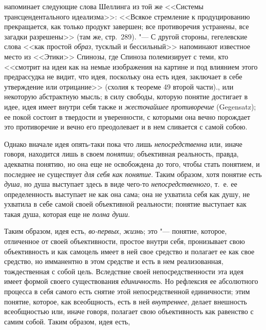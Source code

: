 {{{напоминает следующие слова Шеллинга из той же <<Системы трансцендентального
идеализма>>: <<Всякое стремление к продуцированию прекращается, как только
продукт завершен; все противоречия устранены, все загадки разрешены>> (там
же, стр.~289). "--- С другой стороны, гегелевские слова <<как простой {\em образ},
тусклый и бессильный>> напоминают известное место из <<Этики>>
Спинозы, где Спиноза полемизирует с теми, кто <<смотрит на идеи как на немые
изображения на картине и под влиянием этого предрассудка не видит, что
идея, поскольку она есть идея, заключает в себе утверждение или отрицание>>
(схолия к теореме 49 второй части).\label{bkm:bm91}},
или некоторую абстрактную мысль; в силу свободы, которую
понятие достигает в идее, идея имеет внутри себя также и
{\em жесточайшее противоречие}
(Gegensatz); ее покой состоит в твердости и уверенности, с
которыми она вечно порождает это противоречие и вечно его преодолевает и в
нем сливается с самой собою.

Однако вначале идея опять-таки пока что лишь
{\em непосредственна}
или, иначе говоря, находится лишь в своем
{\em понятии};
объективная реальность, правда, адекватна понятию, но она еще
не освобождена до того, чтобы стать понятием, и последнее не существует
{\em для себя как понятие}.
Таким образом, хотя понятие есть
{\em душа}, но душа
выступает здесь в виде чего-то
{\em непосредственного},
т.~е. ее определенность выступает не как она сама; она не
ухватила себя как душу, не ухватила в себе самой своей объективной
реальности; понятие выступает как такая душа, которая еще не
{\em полна души}.

Таким образом, идея есть,
{\em во-первых},
{\em жизнь}; это
"--- понятие, которое, отличенное от своей объективности,
простое внутри себя, пронизывает свою объективность и как самоцель имеет в
ней свое средство и полагает ее как свое средство, но имманентно в этом
средстве и есть в нем реализованная, тождественная с собой цель. Вследствие
своей непосредственности эта идея имеет формой своего существования
{\em единичность}. Но
рефлексия ее абсолютного процесса в себя самого есть снятие этой
непосредственной единичности; этим понятие, которое, как всеобщность, есть
в ней {\em внутреннее},
делает внешность всеобщностью или, иначе говоря, полагает
свою объективность как равенство с самим собой. Таким образом, идея есть,

}}
